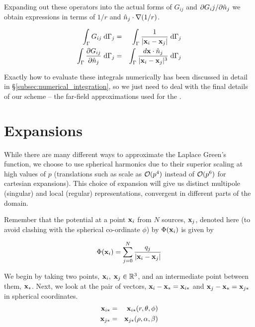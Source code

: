 Expanding out these operators into the actual forms of $G_{ij}$ and $\partial G_ij / \partial \hat{n}_j$ we obtain expressions in terms of $1/r$ and $\hat{n}_j\cdot\nabla(1/r)$.

\begin{eqnarray}
	\label{eqn:laplace_bem_G}\int_{\Gamma} G_{ij}\;\di{\Gamma_j} & = & \int_{\Gamma} \frac{1}{|\vect{x}_i-\vect{x}_j|} \;\di{\Gamma_j} \\ 
	\label{eqn:laplace_bem_dGdn}\int_{\Gamma} \partiald{G_{ij}}{\nhat_j}\;\di{\Gamma_j} & = & \int_{\Gamma}\frac{d\vect{x}\cdot\nhat_j}{|\vect{x}_i-\vect{x}_j|^{3}}\;\di{\Gamma_j}
\end{eqnarray}

Exactly how to evaluate these integrals numerically has been discussed in detail in \S\ref{subsec:numerical_integration}, so we just need to deal with the final details of our scheme -- the far-field approximations used for the {\fmm}.

\section{Expansions}\label{sec:laplace_expansions}

While there are many different ways to approximate the Laplace Green's function, we  choose to use spherical harmonics due to their superior scaling at high values of $p$ (translations such as \mtol scale as $\mathcal{O}(p^{4})$ instead of $\mathcal{O}(p^{6})$ for cartesian expansions). This choice of expansion will give us distinct multipole (singular) and local (regular) representations, convergent in different parts of the domain.

Remember that the potential at a point $\mathbf{x}_i$ from $N$ sources, $\mathbf{x}_j$, denoted here (to avoid clashing with the spherical co-ordinate $\phi$) by $\Phi(\mathbf{x}_i)$ is given by

\begin{equation}
	\Phi(\vect{x}_i) = \sum_{j=0}^{N} \frac{q_j}{|\vect{x}_i - \vect{x}_j|}
	\label{eqn:laplace_initial}
\end{equation}

We begin by taking two points, $\mathbf{x}_i, \; \mathbf{x}_j \in \mathbb{R}^{3}$, and an intermediate point between them, $\mathbf{x}_*$. Next, we look at the pair of vectors, $\mathbf{x}_i - \mathbf{x}_* = \mathbf{x}_{i*}$ and $\mathbf{x}_j - \mathbf{x}_* = \mathbf{x}_{j*}$ in spherical coordinates.
\begin{eqnarray*}
	\mathbf{x}_{i*} & = & \mathbf{x}_{i*}(r, \theta, \phi) \\
	\mathbf{x}_{j*} & = & \mathbf{x}_{j*}(\rho, \alpha, \beta)
\end{eqnarray*}

